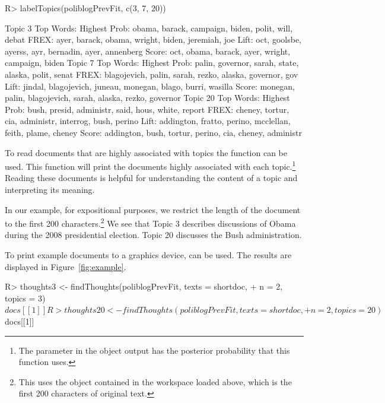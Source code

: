 \documentclass[article,shortnames]{jss}
\begin{document}
\begin{Schunk}
\begin{Sinput}
R> labelTopics(poliblogPrevFit, c(3, 7, 20))
\end{Sinput}
\begin{Soutput}
Topic 3 Top Words:
 	 Highest Prob: obama, barack, campaign, biden, polit, will, debat 
 	 FREX: ayer, barack, obama, wright, biden, jeremiah, joe 
 	 Lift: oct, goolsbe, ayerss, ayr, bernadin, ayer, annenberg 
 	 Score: oct, obama, barack, ayer, wright, campaign, biden 
Topic 7 Top Words:
 	 Highest Prob: palin, governor, sarah, state, alaska, polit, senat 
 	 FREX: blagojevich, palin, sarah, rezko, alaska, governor, gov 
 	 Lift: jindal, blagojevich, juneau, monegan, blago, burri, wasilla 
 	 Score: monegan, palin, blagojevich, sarah, alaska, rezko, governor 
Topic 20 Top Words:
 	 Highest Prob: bush, presid, administr, said, hous, white, report 
 	 FREX: cheney, tortur, cia, administr, interrog, bush, perino 
 	 Lift: addington, fratto, perino, mcclellan, feith, plame, cheney 
 	 Score: addington, bush, tortur, perino, cia, cheney, administr 
\end{Soutput}
\end{Schunk}

To read documents that are highly associated with topics the  function can be used. This function will print the documents highly associated with each topic.\footnote{The  parameter in the  object output has the posterior probability that this function uses.} Reading these documents is helpful for understanding the content of a topic and interpreting its meaning.

In our example, for expositional purposes, we restrict the length of the document to the first 200 characters.\footnote{This uses the object  contained in the workspace loaded above, which is the first 200 characters of original text.} We see that Topic 3 describes discussions of Obama during the 2008 presidential election. Topic 20 discusses the Bush administration.

To print example documents to a graphics device,  can be used. The results are displayed in Figure~\ref{fig:example}.

\begin{Schunk}
\begin{Sinput}
R> thoughts3 <- findThoughts(poliblogPrevFit, texts = shortdoc,
+  n = 2, topics = 3)$docs[[1]]
R> thoughts20 <- findThoughts(poliblogPrevFit, texts = shortdoc,
+  n = 2, topics = 20)$docs[[1]]
\end{Sinput}
\end{Schunk}
\end{document}
